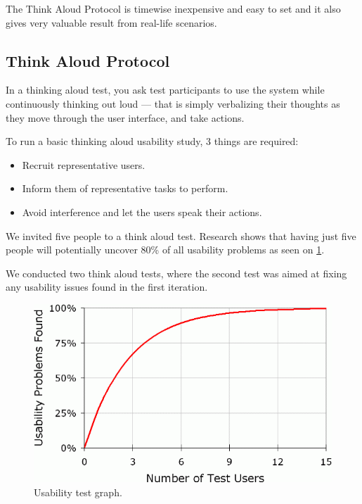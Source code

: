 The Think Aloud Protocol is timewise inexpensive and easy to set and it also gives very valuable result from real-life scenarios.

\subsection{Think Aloud Protocol}
In a thinking aloud test, you ask test participants to use the system while continuously thinking out loud --- that is  simply verbalizing their thoughts as they move through the user interface, and take actions.

To run a basic thinking aloud usability study, 3 things are required:

\begin{itemize}
\item Recruit representative users.
\item Inform them of representative tasks to perform.
\item Avoid interference and let the users speak their actions.
\end{itemize}

We invited five people to a think aloud test. Research shows that having just five people will potentially uncover 80\% of all usability problems \cite{jakobnielsen2000fiveusers} as seen on \ref{fig:usabilitycurve}.

We conducted two think aloud tests, where the second test was aimed at fixing any usability issues found in the first iteration.

\begin{figure}[ht]
\centering
\includegraphics[width=\columnwidth]{usabilitycurve.png}
\caption{Usability test graph.}
\label{fig:usabilitycurve}
\end{figure}

